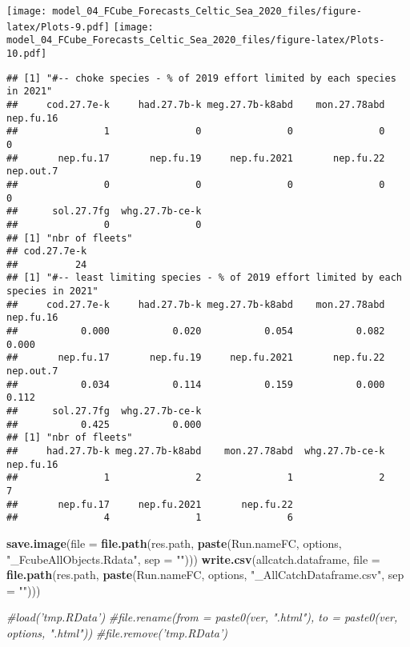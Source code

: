 \documentclass[
]{article}
\newenvironment{Shaded}{\begin{snugshade}}{\end{snugshade}}
\newcommand{\CommentTok}[1]{\textcolor[rgb]{0.56,0.35,0.01}{\textit{#1}}}
\newcommand{\DataTypeTok}[1]{\textcolor[rgb]{0.13,0.29,0.53}{#1}}
\newcommand{\KeywordTok}[1]{\textcolor[rgb]{0.13,0.29,0.53}{\textbf{#1}}}
\newcommand{\NormalTok}[1]{#1}
\newcommand{\StringTok}[1]{\textcolor[rgb]{0.31,0.60,0.02}{#1}}
\begin{document}
\texttt{[image: model\_04\_FCube\_Forecasts\_Celtic\_Sea\_2020\_files/figure-latex/Plots-9.pdf]}
\texttt{[image: model\_04\_FCube\_Forecasts\_Celtic\_Sea\_2020\_files/figure-latex/Plots-10.pdf]}

\begin{verbatim}
## [1] "#-- choke species - % of 2019 effort limited by each species in 2021"
##     cod.27.7e-k     had.27.7b-k meg.27.7b-k8abd    mon.27.78abd       nep.fu.16 
##               1               0               0               0               0 
##       nep.fu.17       nep.fu.19     nep.fu.2021       nep.fu.22       nep.out.7 
##               0               0               0               0               0 
##      sol.27.7fg  whg.27.7b-ce-k 
##               0               0 
## [1] "nbr of fleets"
## cod.27.7e-k 
##          24 
## [1] "#-- least limiting species - % of 2019 effort limited by each species in 2021"
##     cod.27.7e-k     had.27.7b-k meg.27.7b-k8abd    mon.27.78abd       nep.fu.16 
##           0.000           0.020           0.054           0.082           0.000 
##       nep.fu.17       nep.fu.19     nep.fu.2021       nep.fu.22       nep.out.7 
##           0.034           0.114           0.159           0.000           0.112 
##      sol.27.7fg  whg.27.7b-ce-k 
##           0.425           0.000 
## [1] "nbr of fleets"
##     had.27.7b-k meg.27.7b-k8abd    mon.27.78abd  whg.27.7b-ce-k       nep.fu.16 
##               1               2               1               2               7 
##       nep.fu.17     nep.fu.2021       nep.fu.22 
##               4               1               6
\end{verbatim}

\begin{Shaded}
\begin{Highlighting}[]
\KeywordTok{save.image}\NormalTok{(}\DataTypeTok{file =} \KeywordTok{file.path}\NormalTok{(res.path, }\KeywordTok{paste}\NormalTok{(Run.nameFC, options, }\StringTok{"_FcubeAllObjects.Rdata"}\NormalTok{, }
    \DataTypeTok{sep =} \StringTok{""}\NormalTok{)))}
\KeywordTok{write.csv}\NormalTok{(allcatch.dataframe, }\DataTypeTok{file =} \KeywordTok{file.path}\NormalTok{(res.path, }\KeywordTok{paste}\NormalTok{(Run.nameFC, options, }
    \StringTok{"_AllCatchDataframe.csv"}\NormalTok{, }\DataTypeTok{sep =} \StringTok{""}\NormalTok{)))}
\end{Highlighting}
\end{Shaded}

\begin{Shaded}
\begin{Highlighting}[]
\CommentTok{#load('tmp.RData')}
\CommentTok{#file.rename(from = paste0(ver, ".html"), to = paste0(ver, options, ".html"))}
\CommentTok{#file.remove('tmp.RData')}
\end{Highlighting}
\end{Shaded}
\end{document}
